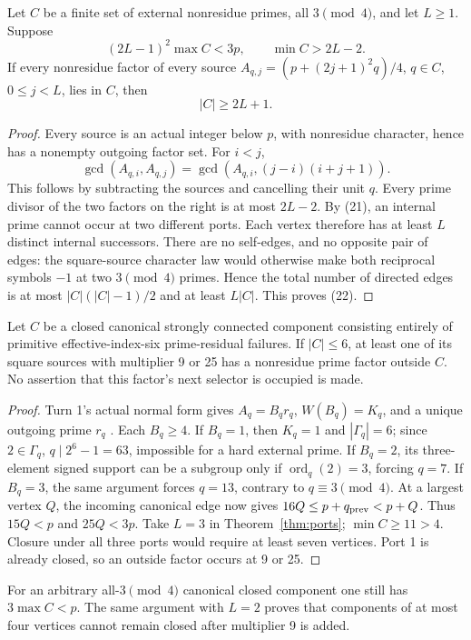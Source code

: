 \begin{theorem}\label{thm:ports}
Let $C$ be a finite set of external nonresidue primes, all $3\pmod4$, and let
$L\ge1$. Suppose
\[
 (2L-1)^2\max C<3p,\qquad \min C>2L-2.                  \tag{21}
\]
If every nonresidue factor of every source
$A_{q,j}=(p+(2j+1)^2q)/4$, $q\in C$, $0\le j<L$, lies in $C$, then
\[
 \boxed{|C|\ge2L+1.}                                   \tag{22}
\]
\end{theorem}
\begin{proof}
Every source is an actual integer below $p$, with nonresidue character, hence
has a nonempty outgoing factor set. For $i<j$,
\[
 \boxed{\gcd(A_{q,i},A_{q,j})
 =\gcd(A_{q,i},(j-i)(i+j+1)).}                          \tag{23}
\]
This follows by subtracting the sources and cancelling their unit $q$. Every
prime divisor of the two factors on the right is at most $2L-2$. By (21), an
internal prime cannot occur at two different ports. Each vertex therefore has
at least $L$ distinct internal successors. There are no self-edges, and no
opposite pair of edges: the square-source character law would otherwise make
both reciprocal symbols $-1$ at two $3\pmod4$ primes. Hence the total number
of directed edges is at most $|C|(|C|-1)/2$ and at least $L|C|$. This proves (22).
\end{proof}

\begin{corollary}
Let $C$ be a closed canonical strongly connected component consisting entirely
of primitive effective-index-six prime-residual failures. If $|C|\le6$, at least
one of its square sources with multiplier 9 or 25 has a nonresidue prime factor
outside $C$. No assertion that this factor's next selector is occupied is made.
\end{corollary}
\begin{proof}
Turn 1's actual normal form gives $A_q=B_qr_q$, $W(B_q)=K_q$, and a unique
outgoing prime $r_q$ \cite[\S5]{Turn1}. Each $B_q\ge4$. If $B_q=1$, then
$K_q=1$ and $|\Gamma_q|=6$; since $2\in\Gamma_q$, $q\mid2^6-1=63$, impossible
for a hard external prime. If $B_q=2$, its three-element signed support can be
a subgroup only if $\operatorname{ord}_q(2)=3$, forcing $q=7$. If $B_q=3$, the
same argument forces $q=13$, contrary to $q\equiv3\pmod4$.
At a largest vertex $Q$, the incoming canonical edge now gives
$16Q\le p+q_{\rm prev}<p+Q$. Thus $15Q<p$ and $25Q<3p$.
Take $L=3$ in Theorem~\ref{thm:ports}; $\min C\ge11>4$. Closure under all three
ports would require at least seven vertices. Port 1 is already closed, so an
outside factor occurs at 9 or 25.
\end{proof}
For an arbitrary all-$3\pmod4$ canonical closed component one still has
$3\max C<p$. The same argument with $L=2$ proves that components of at most
four vertices cannot remain closed after multiplier 9 is added.

